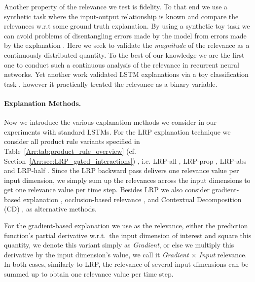 \documentclass[runningheads]{llncs}
\begin{document}
Another property of the relevance we test is fidelity. To that end we use a synthetic task where the input-output relationship is known and compare the relevances w.r.t some ground truth explanation.
By using a synthetic toy task we can avoid problems of disentangling errors made by the model from errors made by the explanation \cite{Arr:Sundararajan:ICML2017}.
Here we seek to validate the {\it magnitude} of the relevance as a continuously distributed quantity. 
To the best of our knowledge we are the first one to conduct such a continuous analysis of the relevance in recurrent neural networks.
Yet another work validated LSTM explanations via a toy classification task \cite{Arr:Yang:ICHI2018}, however it practically treated the relevance as a binary variable.

\paragraph{Explanation Methods.}
Now we introduce the various explanation methods we consider in our experiments with standard LSTMs.
For the LRP explanation technique we consider all product rule variants specified in Table~\ref{Arr:tab:product_rule_overview} (cf. Section~\ref{Arr:sec:LRP_gated_interactions}) , i.e. LRP-all \cite{Arr:Arras:17}, LRP-prop \cite{Arr:Ding:ACL2017,Arr:Arjona-Medina:18}, LRP-abs and LRP-half \cite{Arr:Arjona-Medina:18}.
Since the LRP backward pass delivers one relevance value per input dimension, we simply sum up the relevances across the input dimensions to get one relevance value per time step. 
Besides LRP we also consider gradient-based explanation \cite{Arr:Gevrey:2003,Arr:Li:NAACL2016,Arr:Simonyan:ICLR2014,Arr:Denil:2015}, occlusion-based relevance \cite{Arr:Li:ArXiv2017,Arr:Zeiler:ECCV2014}, and Contextual Decomposition (CD) \cite{Arr:Murdoch:ICLR2018}, as alternative methods.

For the gradient-based explanation we use as the relevance, either the prediction function's partial derivative w.r.t.\ the input dimension of interest and square this quantity, we denote this variant simply as {\it Gradient}, or else we multiply this derivative by the input dimension's value, we call it {\it Gradient $\times$ Input} relevance. In both cases, similarly to LRP, the relevance of several input dimensions can be summed up to obtain one relevance value per time step.
\end{document}
